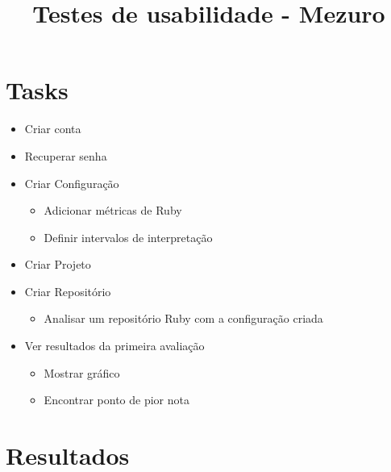 \documentclass[11pt,a4paper]{article}
\title{Testes de usabilidade - Mezuro}
\begin{document}
  \maketitle

  \section{Tasks}
  \begin{itemize}
    \item Criar conta
    \item Recuperar senha
    \item Criar Configuração
      \begin{itemize}
        \item Adicionar métricas de Ruby
        \item Definir intervalos de interpretação
      \end{itemize}
    \item Criar Projeto
    \item Criar Repositório
      \begin{itemize}
        \item Analisar um repositório Ruby com a configuração criada
      \end{itemize}
    \item Ver resultados da primeira avaliação
      \begin{itemize}
        \item Mostrar gráfico
        \item Encontrar ponto de pior nota
      \end{itemize}
  \end{itemize}

  \section{Resultados}
  
  
\end{document}
